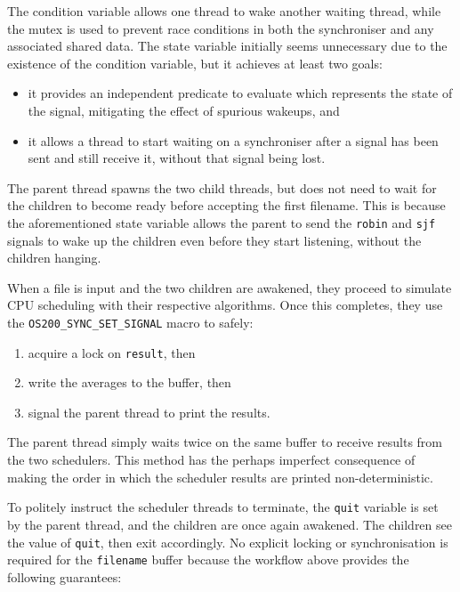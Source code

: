 \documentclass[a4paper,12pt,titlepage]{article}
\begin{document}
The condition variable allows one thread to wake another waiting thread, while
the mutex is used to prevent race conditions in both the synchroniser and any
associated shared data. The state variable initially seems unnecessary due to
the existence of the condition variable, but it achieves at least two goals:

\begin{itemize}
	\item it provides an independent predicate to evaluate which represents
	      the state of the signal, mitigating the effect of spurious
	      wakeups, and
	\item it allows a thread to start waiting on a synchroniser after a
	      signal has been sent and still receive it, without that signal
	      being lost.
\end{itemize}

The parent thread spawns the two child threads, but does not need to wait for
the children to become ready before accepting the first filename. This is
because the aforementioned state variable allows the parent to send the
\texttt{robin} and \texttt{sjf} signals to wake up the children even before
they start listening, without the children hanging.

When a file is input and the two children are awakened, they proceed to
simulate CPU scheduling with their respective algorithms. Once this completes,
they use the \texttt{OS200\_SYNC\_SET\_SIGNAL} macro to safely:

\begin{enumerate}
	\item acquire a lock on \texttt{result}, then
	\item write the averages to the buffer, then
	\item signal the parent thread to print the results.
\end{enumerate}

The parent thread simply waits twice on the same buffer to receive results from
the two schedulers. This method has the perhaps imperfect consequence of making
the order in which the scheduler results are printed non-deterministic.

To politely instruct the scheduler threads to terminate, the \texttt{quit}
variable is set by the parent thread, and the children are once again awakened.
The children see the value of \texttt{quit}, then exit accordingly. No explicit
locking or synchronisation is required for the \texttt{filename} buffer because
the workflow above provides the following guarantees:
\end{document}
